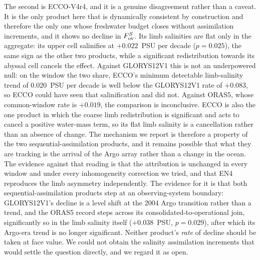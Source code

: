 The second is ECCO-V4r4, and it is a genuine disagreement rather than a caveat.
It is the only product here that is dynamically consistent by construction and
therefore the only one whose freshwater budget closes without assimilation
increments, and it shows no decline in $F_{\mathrm{ov}}^{S}$. Its limb salinities are flat only in the
aggregate: its upper cell salinifies at $+0.022$~PSU per decade ($p=0.025$),
the same sign as the other two products, while a significant redistribution
towards its abyssal cell cancels the effect. Against GLORYS12V1 this is
not an underpowered null: on the window the two share, ECCO's minimum detectable
limb-salinity trend of 0.020~PSU per decade is well below the GLORYS12V1 rate of
$+0.083$, so ECCO could have seen that salinification and did not. Against
ORAS5, whose common-window rate is $+0.019$, the comparison is inconclusive.
ECCO is also the one product in which the coarse limb redistribution is
significant and acts to cancel a positive water-mass term, so its flat limb
salinity is a cancellation rather than an absence of change. The mechanism we report is therefore a
property of the two sequential-assimilation products, and it remains possible
that what they are tracking is the arrival of the Argo array rather than a
change in the ocean. The evidence against that reading is that the attribution
is unchanged in every window and under every inhomogeneity correction we tried,
and that EN4 reproduces the limb asymmetry independently. The evidence for it is
that both sequential-assimilation products step at an observing-system boundary:
GLORYS12V1's decline is a level shift at the 2004 Argo transition rather than a
trend, and the ORAS5 record steps across its consolidated-to-operational join,
significantly so in the limb salinity itself ($+0.038$~PSU, $p=0.029$), after
which its Argo-era trend is no longer significant. Neither product's \emph{rate}
of decline should be taken at face value. We could not obtain the salinity
assimilation increments that would settle the question directly, and we regard
it as open.

